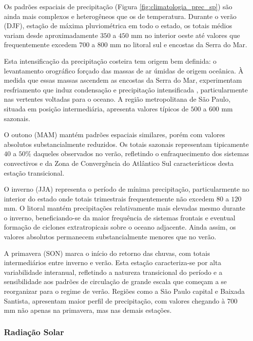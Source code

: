 Os padrões espaciais de precipitação (Figura \ref{fig:climatologia_prec_sp}) são ainda mais complexos e heterogêneos que os de temperatura. Durante o verão (DJF), estação de máxima pluviométrica em todo o estado, os totais médios variam desde aproximadamente $350$ a $450$ mm no interior oeste até valores que frequentemente excedem $700$ a $800$ mm no litoral sul e encostas da Serra do Mar.

Esta intensificação da precipitação costeira tem origem bem definida: o levantamento orográfico forçado das massas de ar úmidas de origem oceânica. À medida que essas massas ascendem as encostas da Serra do Mar, experimentam resfriamento que induz condensação e precipitação intensificada \citep{eagleson1978}, particularmente nas vertentes voltadas para o oceano. A região metropolitana de São Paulo, situada em posição intermediária, apresenta valores típicos de $500$ a $600$ mm sazonais.

O outono (MAM) mantém padrões espaciais similares, porém com valores absolutos substancialmente reduzidos. Os totais sazonais representam tipicamente $40$ a $50\%$ daqueles observados no verão, refletindo o enfraquecimento dos sistemas convectivos e da Zona de Convergência do Atlântico Sul \citep{Nobre2011} característicos desta estação transicional.

O inverno (JJA) representa o período de mínima precipitação, particularmente no interior do estado onde totais trimestrais frequentemente não excedem $80$ a $120$ mm. O litoral mantém precipitações relativamente mais elevadas mesmo durante o inverno, beneficiando-se da maior frequência de sistemas frontais e eventual formação de ciclones extratropicais sobre o oceano adjacente. Ainda assim, os valores absolutos permanecem substancialmente menores que no verão.

A primavera (SON) marca o início do retorno das chuvas, com totais intermediários entre inverno e verão. Esta estação caracteriza-se por alta variabilidade interanual, refletindo a natureza transicional do período e a sensibilidade aos padrões de circulação de grande escala que começam a se reorganizar para o regime de verão. Regiões como a São Paulo capital e Baixada Santista, apresentam maior perfil de precipitação, com valores chegando à 700 mm não apenas na primavera, mas nas demais estações.
\newpage
\subsubsection*{Radiação Solar}

